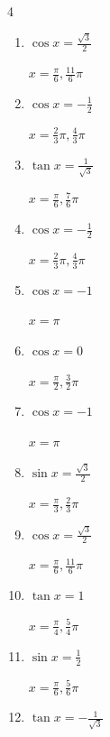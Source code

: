 \begin{multicols}{4}
\begin{enumerate}
        $\displaystyle x = 0$

  \item $\displaystyle \cos{x}  = \frac{\sqrt{3}}{2}$

        $\displaystyle x = \frac{\pi}{6} , \frac{11}{6}\pi$

\columnbreak %

  \item $\displaystyle \cos{x}  = -\frac{1}{2}$

        $\displaystyle x = \frac{2}{3}\pi , \frac{4}{3}\pi$

  \item $\displaystyle \tan{x}  = \frac{1}{\sqrt{3}}$

        $\displaystyle x = \frac{\pi}{6} , \frac{7}{6}\pi$

  \item $\displaystyle \cos{x}  = -\frac{1}{2}$

        $\displaystyle x = \frac{2}{3}\pi , \frac{4}{3}\pi$

  \item $\displaystyle \cos{x}  = -1$

        $\displaystyle x = \pi$

  \item $\displaystyle \cos{x}  = 0$

        $\displaystyle x = \frac{\pi}{2} , \frac{3}{2}\pi$

  \item $\displaystyle \cos{x}  = -1$

        $\displaystyle x = \pi$

  \item $\displaystyle \sin{x}  = \frac{\sqrt{3}}{2}$

        $\displaystyle x = \frac{\pi}{3} , \frac{2}{3}\pi$

  \item $\displaystyle \cos{x}  = \frac{\sqrt{3}}{2}$

        $\displaystyle x = \frac{\pi}{6} , \frac{11}{6}\pi$

  \item $\displaystyle \tan{x}  = 1$

        $\displaystyle x = \frac{\pi}{4} , \frac{5}{4}\pi$

  \item $\displaystyle \sin{x}  = \frac{1}{2}$

        $\displaystyle x = \frac{\pi}{6} , \frac{5}{6}\pi$

  \item $\displaystyle \tan{x}  = -\frac{1}{\sqrt{3}}$


\end{enumerate}
\end{multicols}
